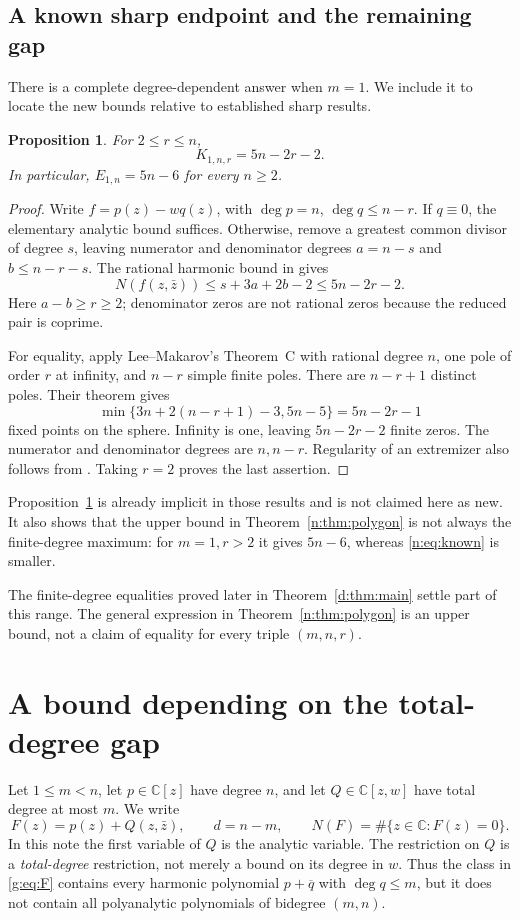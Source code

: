 \documentclass[UTF8,11pt]{ctexart}
\newtheorem{prop}[thm]{Proposition}
\theoremstyle{definition}
\numberwithin{equation}{section}
\newcommand{\C}{\mathbb C}\newcommand{\R}{\mathbb R}
\begin{document}
\subsection{A known sharp endpoint and the remaining gap}\label{n:sec:known}
There is a complete degree-dependent answer when $m=1$. We include it to
locate the new bounds relative to established sharp results.
\begin{prop}\label{n:prop:known}
For $2\le r\le n$,
\begin{equation}\label{n:eq:known}
 K_{1,n,r}=5n-2r-2.
\end{equation}
In particular, $E_{1,n}=5n-6$ for every $n\ge2$.
\end{prop}
\begin{proof}
Write $f=p(z)-wq(z)$, with $\deg p=n$, $\deg q\le n-r$.
If $q\equiv0$, the elementary analytic bound suffices. Otherwise, remove
a greatest common divisor of degree $s$, leaving numerator and denominator
degrees $a=n-s$ and $b\le n-r-s$. The rational harmonic bound in
\cite[Theorem~1.1, author version v2, p.~2]{LZ18} gives
\[
 N(f(z,\bar z))\le s+3a+2b-2\le5n-2r-2.
\]
Here $a-b\ge r\ge2$; denominator zeros are not rational zeros because the
reduced pair is coprime.

For equality, apply Lee--Makarov's Theorem~C
\cite[p.~3]{LM14} with rational degree $n$, one pole of order $r$ at
infinity, and $n-r$ simple finite poles. There are $n-r+1$ distinct poles.
Their theorem gives
\[
 \min\{3n+2(n-r+1)-3,5n-5\}=5n-2r-1
\]
fixed points on the sphere. Infinity is one, leaving $5n-2r-2$ finite
zeros. The numerator and denominator degrees are $n,n-r$.
Regularity of an extremizer also follows from
\cite[Theorem~3.5, author version v2, p.~7]{LZ18}.
Taking $r=2$ proves the last assertion.
\end{proof}

Proposition~\ref{n:prop:known} is already implicit in those results and is not
claimed here as new. It also shows that the upper bound in
Theorem~\ref{n:thm:polygon} is not always the finite-degree maximum: for
$m=1,r>2$ it gives $5n-6$, whereas \eqref{n:eq:known} is smaller.

The finite-degree equalities proved later in Theorem~\ref{d:thm:main}
settle part of this range. The general expression in
Theorem~\ref{n:thm:polygon} is an upper bound, not a claim of equality
for every triple $(m,n,r)$.

\section{A bound depending on the total-degree gap}\label{g:sec:gap}
Let $1\le m<n$, let $p\in\C[z]$ have degree $n$, and let
$Q\in\C[z,w]$ have total degree at most $m$. We write
\begin{equation}\label{g:eq:F}
 F(z)=p(z)+Q(z,\bar z),\qquad d=n-m,\qquad
 N(F)=\#\{z\in\C:F(z)=0\}.
\end{equation}
In this note the first variable of $Q$ is the analytic variable. The
restriction on $Q$ is a \emph{total-degree} restriction, not merely a bound
on its degree in $w$. Thus the class in \eqref{g:eq:F} contains every harmonic
polynomial $p+\overline q$ with $\deg q\le m$, but it does not contain all
polyanalytic polynomials of bidegree $(m,n)$.
\end{document}

